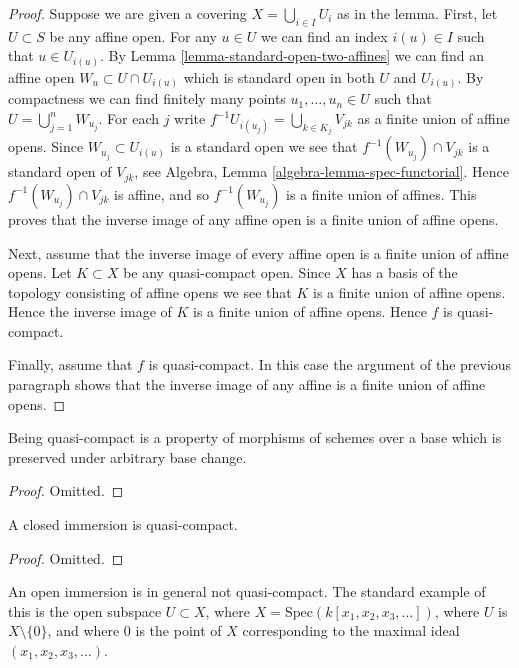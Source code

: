 \begin{proof}
Suppose we are given a covering $X = \bigcup_{i \in I} U_i$ as in the lemma.
First, let $U \subset S$ be any affine open. For any $u \in U$
we can find an index $i(u) \in I$ such that $u \in U_{i(u)}$.
By Lemma \ref{lemma-standard-open-two-affines} we can find
an affine open $W_u \subset U \cap U_{i(u)}$
which is standard open in both $U$ and $U_{i(u)}$.
By compactness we can find finitely many points $u_1, \ldots, u_n \in U$
such that $U = \bigcup_{j = 1}^n W_{u_j}$. For each $j$ write
$f^{-1}U_{i(u_j)} = \bigcup_{k \in K_j} V_{jk}$ as a finite
union of affine opens. Since $W_{u_j} \subset U_{i(u)}$ is a standard
open we see that $f^{-1}(W_{u_j}) \cap V_{jk}$ is a standard
open of $V_{jk}$, see Algebra, Lemma \ref{algebra-lemma-spec-functorial}.
Hence $f^{-1}(W_{u_j}) \cap V_{jk}$ is affine, and so
$f^{-1}(W_{u_j})$ is a finite union of affines. This proves that the
inverse image of any affine open is a finite union of affine opens.

\medskip\noindent
Next, assume that the inverse image of every affine open is a finite
union of affine opens.
Let $K \subset X$ be any quasi-compact open. Since $X$ has a basis
of the topology consisting of affine opens we see that $K$ is a finite
union of affine opens. Hence the inverse image of $K$ is a finite
union of affine opens. Hence $f$ is quasi-compact.

\medskip\noindent
Finally, assume that $f$ is quasi-compact. In this case the argument
of the previous paragraph shows that the inverse image of any affine
is a finite union of affine opens.
\end{proof}

\begin{lemma}
\label{lemma-quasi-compact-preserved-base-change}
Being quasi-compact is a property of morphisms of schemes
over a base which is preserved under arbitrary base change.
\end{lemma}

\begin{proof}
Omitted.
\end{proof}

\begin{lemma}
\label{lemma-closed-immersion-quasi-compact}
A closed immersion is quasi-compact.
\end{lemma}

\begin{proof}
Omitted.
\end{proof}

\begin{example}
\label{example-open-immersion-not-quasi-compact}
An open immersion is in general not quasi-compact.
The standard example of this is the open subspace
$U \subset X$, where $X = \text{Spec}(k[x_1, x_2, x_3, \ldots])$,
where $U$ is $X \setminus \{0\}$, and where $0$ is the point
of $X$ corresponding to the maximal ideal
$(x_1, x_2, x_3, \ldots)$.
\end{example}











